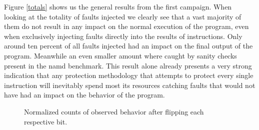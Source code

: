 \documentclass[lettersize,journal]{IEEEtran}
\begin{document}
Figure \ref{totals} shows us the general results from the first campaign. When looking at the totality of faults injected we clearly see that a vast majority of them do not result in any impact on the normal execution of the program, even when exclusively injecting faults directly into the results of instructions. Only around ten percent of all faults injected had an impact on the final output of the program. Meanwhile an even smaller amount where caught by sanity checks present in the namd benchmark. This result alone already presents a very strong indication that any protection methodology that attempts to protect every single instruction will inevitably spend most its resources catching faults that would not have had an impact on the behavior of the program.\\
\begin{figure}[!t] 
    \centering
    \hspace{0mm}
\caption{Normalized counts of observed behavior after flipping each respective bit.}
\label{perbits}
\end{figure}
\end{document}
